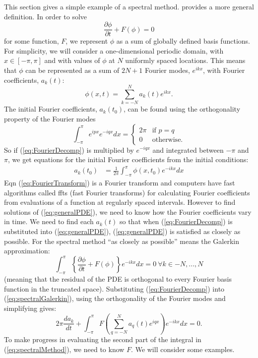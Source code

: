 This section gives a simple example of a spectral method. \citet{Dur11}
provides a more general definition. In order to solve
\begin{equation}
\frac{\partial\phi}{\partial t}+F\left(\phi\right)=0\label{eq:generalPDE}
\end{equation}
for some function, $F$, we represent $\phi$ as a sum of globally
defined basis functions. For simplicity, we will consider a one-dimensional
periodic domain, with $x\in[-\pi,\pi]$ and with values of $\phi$
at $N$ uniformly spaced locations. This means that $\phi$ can be
represented as a sum of $2N+1$ Fourier modes, $e^{ikx}$, with Fourier
coefficients, $a_{k}\left(t\right)$:
\begin{equation}
\phi\left(x,t\right)=\sum_{k=-N}^{N}a_{k}\left(t\right)e^{ikx}.\label{eq:FourierDecomp}
\end{equation}
The initial Fourier coefficients, $a_{k}\left(t_{0}\right)$, can
be found using the orthogonality property of the Fourier modes
\begin{equation}
\int_{-\pi}^{\pi}e^{ipx}e^{-iqx}dx=\begin{cases}
2\pi & \text{if }p=q\\
0 & \text{otherwise.}
\end{cases}\label{eq:FourierOrthogonal}
\end{equation}
So if (\ref{eq:FourierDecomp}) is multiplied by $e^{-iqx}$ and integrated
between $-\pi$ and $\pi$, we get equations for the initial Fourier
coefficients from the initial conditions:
\begin{align}
a_{k}\left(t_{0}\right) & =\frac{1}{2\pi}\int_{-\pi}^{\pi}\phi\left(x,t_{0}\right)e^{-ikx}dx\label{eq:FourierTransform}
\end{align}
Eqn (\ref{eq:FourierTransform}) is a Fourier transform and computers
have fast algorithms called ffts (fast Fourier transforms) for calculating
Fourier coefficients from evaluations of a function at regularly spaced
intervals. However to find solutions of (\ref{eq:generalPDE}), we
need to know how the Fourier coefficients vary in time. We need to
find each $a_{k}\left(t\right)$ so that when (\ref{eq:FourierDecomp})
is substituted into (\ref{eq:generalPDE}), (\ref{eq:generalPDE})
is satisfied as closely as possible. For the spectral method ``as
closely as possible'' means the Galerkin approximation:
\begin{equation}
\int_{-\pi}^{\pi}\left\{ \frac{\partial\phi}{\partial t}+F\left(\phi\right)\right\} e^{-ikx}dx=0\ \forall k\in-N,...,N\label{eq:spectralGalerkin}
\end{equation}
(meaning that the residual of the PDE is orthogonal to every Fourier
basis function in the truncated space). Substituting (\ref{eq:FourierDecomp})
into (\ref{eq:spectralGalerkin}), using the orthogonality of the
Fourier modes and simplifying gives:
\begin{equation}
2\pi\frac{da_{k}}{dt}+\int_{-\pi}^{\pi}F\left(\sum_{q=-N}^{N}a_{q}\left(t\right)e^{iqx}\right)e^{-ikx}dx=0.\label{eq:spectralMethod}
\end{equation}
To make progress in evaluating the second part of the integral in
(\ref{eq:spectralMethod}), we need to know $F$. We will consider
some examples.


